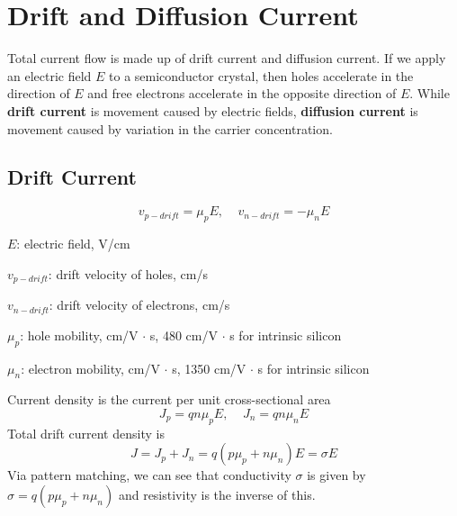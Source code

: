 \chapter{Drift and Diffusion Current}
Total current flow is made up of drift current and diffusion current. If we apply an electric field $E$ to a semiconductor crystal, then holes accelerate in the direction of $E$ and free electrons accelerate in the opposite direction of $E$. While \textbf{drift current} is movement caused by electric fields, \textbf{diffusion current} is movement caused by variation in the carrier concentration. 

\section{Drift Current}
    \[v_{p-drift} = \mu_p E, ~~~~~ v_{n-drift} = - \mu_n E\]

\begin{gline}
    \item $E$: electric field, V/cm
    \item $v_{p-drift}$: drift velocity of holes, cm/s
    \item $v_{n-drift}$: drift velocity of electrons, cm/s
    \item $\mu_p$: hole mobility, cm\sq/V $\cdot$ s, 480 cm\sq/V $\cdot$ s for intrinsic silicon
    \item $\mu_n$: electron mobility, cm\sq/V $\cdot$ s, 1350 cm\sq/V $\cdot$ s for intrinsic silicon
\end{gline}

Current density is the current per unit cross-sectional area
    \[J_p = qn\mu_p E, ~~~~~ J_n = qn\mu_n E\]
Total drift current density is
    \[J = J_p + J_n = q(p\mu_p + n\mu_n) E = \sigma E\]
Via pattern matching, we can see that conductivity $\sigma$ is given by $\sigma = q(p\mu_p + n\mu_n)$ and resistivity is the inverse of this.

